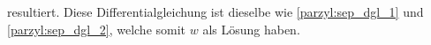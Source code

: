 resultiert. Diese Differentialgleichung ist dieselbe wie 
\eqref{parzyl:sep_dgl_1} und \eqref{parzyl:sep_dgl_2}, welche somit
$w$ als Lösung haben.

